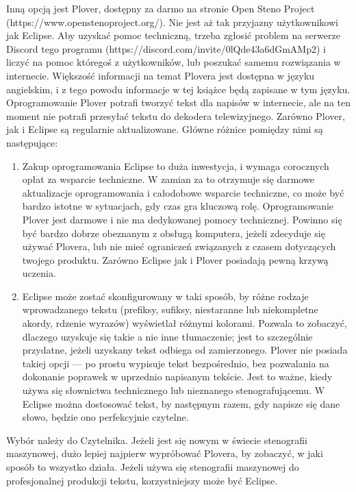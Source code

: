 \documentclass[12p, oneside]{book}
\begin{document}
Inną opcją jest Plover, dostępny za darmo na stronie Open Steno Project (https://www.openstenoproject.org/). Nie jest aż tak przyjazny użytkownikowi jak Eclipse. Aby uzyskać pomoc techniczną, trzeba zgłosić problem na serwerze Discord tego programu (https://discord.com/invite/0lQde43a6dGmAMp2) i liczyć na pomoc któregoś z użytkowników, lub poszukać samemu rozwiązania w internecie. Większość informacji na temat Plovera jest dostępna w języku angielskim, i z tego powodu informacje w tej książce będą zapisane w tym języku. Oprogramowanie Plover potrafi tworzyć tekst dla napisów w internecie, ale na ten moment nie potrafi przesyłać tekstu do dekodera telewizyjnego. Zarówno Plover, jak i Eclipse są regularnie aktualizowane. Główne różnice pomiędzy nimi są następujące:

\begin{enumerate}
	\item Zakup oprogramowania Eclipse to duża inwestycja, i wymaga corocznych opłat za wsparcie techniczne. W zamian za to otrzymuje się darmowe aktualizacje oprogramowania i całodobowe wsparcie techniczne, co może być bardzo istotne w sytuacjach, gdy czas gra kluczową rolę. Oprogramowanie Plover jest darmowe i nie ma dedykowanej pomocy technicznej. Powinno się być bardzo dobrze obeznanym z obsługą komputera, jeżeli zdecyduje się używać Plovera, lub nie mieć ograniczeń związanych z czasem dotyczących twojego produktu. Zarówno Eclipse jak i Plover posiadają pewną krzywą uczenia.

	\item Eclipse może zostać skonfigurowany w taki sposób, by różne rodzaje wprowadzanego tekstu (prefiksy, sufiksy, niestaranne lub niekompletne akordy, rdzenie wyrazów) wyświetlał różnymi kolorami. Pozwala to zobaczyć, dlaczego uzyskuje się takie a nie inne tłumaczenie; jest to szczególnie przydatne, jeżeli uzyskany tekst odbiega od zamierzonego. Plover nie posiada takiej opcji --- po prostu wypisuje tekst bezpośrednio, bez pozwalania na dokonanie poprawek w uprzednio napisanym tekście. Jest to ważne, kiedy używa się słownictwa technicznego lub nieznanego stenografującemu. W Eclipse można dostosować tekst, by następnym razem, gdy napisze się dane słowo, będzie ono perfekcyjnie czytelne.
\end{enumerate}

Wybór należy do Czytelnika. Jeżeli jest się nowym w świecie stenografii maszynowej, dużo lepiej najpierw wypróbować Plovera, by zobaczyć, w jaki sposób to wszystko działa. Jeżeli używa się stenografii maszynowej do profesjonalnej produkcji tekstu, korzystniejszy może być Eclipse.
\end{document}
